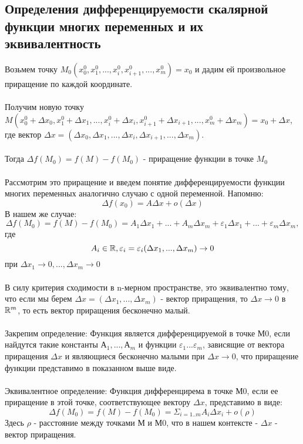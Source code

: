\subsection{Определения дифференцируемости скалярной функции многих переменных и их эквивалентность}
Возьмем точку $M_0(x^0_0, x^0_1, ..., x^0_i, x^0_{i+1}, ..., x^0_m) = x_0$ и дадим ей произвольное приращение по каждой координате. 
\\
\\
Получим новую точку $M(x^0_0 + \Delta x_0, x^0_1 + \Delta x_1, ..., x^0_i + \Delta x_i, x^0_{i+1} + \Delta x_{i+1}, ..., x^0_m + \Delta x_m) = x_0 + \Delta x$, где вектор $\Delta x = (\Delta x_0, \Delta x_1, ..., \Delta x_i, \Delta x_{i+1}, ..., \Delta x_m)$.
\\
\\
Тогда $\Delta f(M_0) = f(M) - f(M_0)$ - приращение функции в точке $M_0$
\\
\\
Рассмотрим это приращение и введем понятие дифференцируемости функции многих переменных аналогично случаю с одной переменной. Напомню:
$$
\Delta f(x_0) = A \Delta x + o(\Delta x)
$$
В нашем же случае:
$$
\Delta f(M_0) = f(M) - f(M_0) = A_1\Delta x_1 + ... + A_m\Delta x_m + \varepsilon_1 \Delta x_1 + ... + \varepsilon_m \Delta x_m,
$$
где 
$$
A_i \in \mathbb{R}, \varepsilon_i = \varepsilon_i(\Delta x_1, ..., \Delta x_m) \rightarrow 0
$$
при $\Delta x_1 \rightarrow 0,...,\Delta x_m \rightarrow 0$
\\
\\
В силу критерия сходимости в n-мерном пространстве, это эквивалентно тому, что если мы берем $\Delta x = (\Delta x_1, ..., \Delta x_m)$ - вектор приращения, то $\Delta x \rightarrow 0$ в $\mathbb{R}^m$, то есть вектор приращения бесконечно малый.
\\
\\
Закрепим определение:
Функция является дифференцируемой в точке М0, если найдутся такие константы $А_1, ..., А_m$ и функции $\varepsilon_1 ... \varepsilon_m$, зависящие от вектора приращения $\Delta x$ и являющиеся бесконечно малыми при $\Delta x \rightarrow 0$, что приращение функции представимо в показанном выше виде.
\\
\\
Эквивалентное определение:
Функция дифференцирема в точке М0, если ее приращение в этой точке, соответствующее вектору $\Delta x$, представимо в виде:
$$
\Delta f(M_0) = f(M) - f(M_0) = \Sigma_{i = 1 .. m} A_i \Delta x_i + o(\rho)
$$
Здесь $\rho$ - расстояние между точками М  и М0, что в нашем контексте - $\Delta x$ - вектор приращения.
